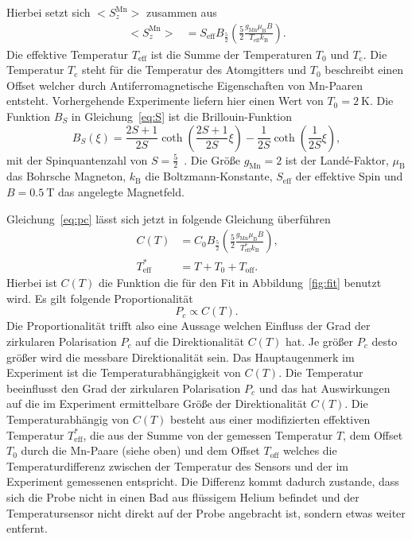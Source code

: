 Hierbei setzt sich $\bigl< S^\text{Mn}_{z} \bigr>$ zusammen aus 
\begin{align}
    \label{eq:S}
    \bigl< S^\text{Mn}_{z} \bigr> &= S_\text{eff} B_\text{$\frac{5}{2}$} \left(\frac{5}{2}\frac{g_\text{Mn} \mu_\text{B} B }{T_\text{eff} k_\text{B}} \right)\text{.}
\end{align}
Die effektive Temperatur $T_\text{eff}$ ist die Summe der Temperaturen $T_0$ und $T_\text{c}$.
Die Temperatur $T_\text{c}$
steht für die Temperatur des Atomgitters und $T_0$ beschreibt einen Offset welcher durch Antiferromagnetische Eigenschaften
von Mn-Paaren entsteht. Vorhergehende Experimente liefern hier einen Wert von $T_0=\SI{2}{\kelvin}$.
Die Funktion $B_{S}$ in Gleichung~\ref{eq:S} ist die Brillouin-Funktion 
\begin{equation}
    B_{S}(\xi) = \frac{2S+1}{2S}\coth\left(\frac{2S+1}{2S}\xi\right) - \frac{1}{2S}\coth(\frac{1}{2S}\xi),
\end{equation}
mit der Spinquantenzahl von $ S = \frac{5}{2}$~\cite{felix}.
Die Größe $g_\text{Mn} = 2 $ ist der Landé-Faktor, $\mu_\text{B}$ das Bohrsche Magneton,
$k_\text{B}$ die Boltzmann-Konstante, $S_\text{eff}$ der effektive Spin und $B=\SI{0,5}{\tesla} $ das angelegte Magnetfeld.

Gleichung~\ref{eq:pc} lässt sich jetzt in folgende Gleichung überführen
\begin{align}
    C(T)&= C_0 B_\text{$\frac{5}{2}$} \left( \frac{5}{2}\frac{g_\text{Mn} \mu_\text{B} B }{T^*_\text{eff} k_\text{B}}\right)\text{,} \\
    T^*_\text{eff} &= T + T_0 + T_\text{off}\text{.}
    \label{eq:C}
\end{align}
Hierbei ist $C(T)$ die Funktion die für den Fit in Abbildung~\ref{fig:fit} benutzt wird.
Es gilt folgende Proportionalität
\begin{equation}
    P_{c} \propto C(T). %
\end{equation}
Die Proportionalität trifft also eine Aussage welchen Einfluss der Grad der zirkularen Polarisation $P_{c}$
auf die Direktionalität $C(T)$ hat. 
Je größer $P_{c}$ desto größer wird die messbare Direktionalität sein. 
Das Hauptaugenmerk im Experiment ist die Temperaturabhängigkeit von $C(T)$.
Die Temperatur beeinflusst den Grad der zirkularen Polarisation $P_c$ und das hat 
Auswirkungen auf die im Experiment ermittelbare Größe der Direktionalität $C(T)$. 
Die Temperaturabhängig von $C(T)$ besteht aus
einer modifizierten effektiven Temperatur $T^*_\text{eff}$, die aus der Summe von der gemessen Temperatur $T$, dem 
Offset $T_0$ durch die Mn-Paare (siehe oben)  und dem Offset $T_\text{off}$ welches
die Temperaturdifferenz zwischen der Temperatur des Sensors und der im Experiment gemessenen entspricht. 
Die Differenz kommt dadurch zustande, dass sich die Probe nicht in einen Bad aus flüssigem Helium befindet
und der Temperatursensor nicht direkt auf der Probe angebracht ist, sondern etwas weiter entfernt. 

